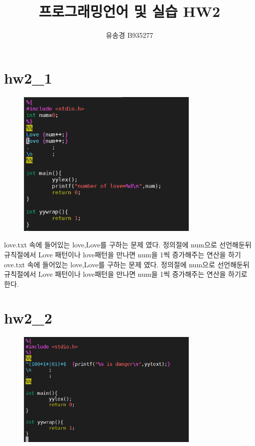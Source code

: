\documentclass[conference]{IEEEtran}
\begin{document}
\title{\LARGE 프로그래밍언어 및 실습 HW2}
\author{ 유송경 B935277}
\maketitle




\section{hw2_1}

\begin{figure}[ht!] %
\centering
\includegraphics[width=3.45in]{1.png}
\label{picture}
\end{figure}

love.txt 속에 들어있는 love,Love를 구하는 문제 였다. 정의절에 num으로 선언해둔뒤 규칙절에서 Love 패턴이나 love패턴을 만나면 num을 1씩 증가해주는 연산을 하기ove.txt 속에 들어있는 love,Love를 구하는 문제 였다. 정의절에 num으로 선언해둔뒤 규칙절에서 Love 패턴이나 love패턴을 만나면 num을 1씩 증가해주는 연산을 하기로  한다. 


\section{hw2_2}

\begin{figure}[ht!] %
\centering
\includegraphics[width=3.45in]{2.png}
\label{picture}
\end{figure}
\end{document}
